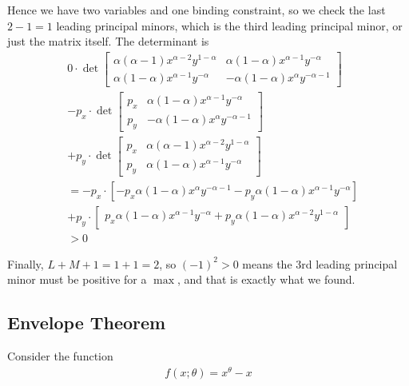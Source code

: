 \documentclass{article}
\begin{document}
Hence we have two variables and one binding constraint, so we check the last $2 - 1 = 1$ leading principal minors, which is the third leading principal minor, or just the matrix itself. The determinant is
\begin{align*}
  &
  0 \cdot \det
  \begin{bmatrix}
    \alpha (\alpha - 1) x^{\alpha - 2} y^{1 - \alpha} & \alpha (1 - \alpha) x^{\alpha - 1} y^{- \alpha} \\
    \alpha (1 - \alpha) x^{\alpha - 1} y^{- \alpha} & - \alpha (1 - \alpha) x^{\alpha} y^{-\alpha - 1}
  \end{bmatrix}
  \\
  &
  -
  p_x \cdot \det
  \begin{bmatrix}
    p_x  & \alpha (1 - \alpha) x^{\alpha - 1} y^{- \alpha} \\
    p_y  & - \alpha (1 - \alpha) x^{\alpha} y^{-\alpha - 1}
  \end{bmatrix}
  \\
  &
  +
  p_y \cdot \det
  \begin{bmatrix}
    p_x  & \alpha (\alpha - 1) x^{\alpha - 2} y^{1 - \alpha} \\
    p_y  & \alpha (1 - \alpha) x^{\alpha - 1} y^{- \alpha}
  \end{bmatrix}
  \\
  &
  =
  -
  p_x \cdot
  \left[
    - p_x \alpha (1 - \alpha) x^{\alpha} y^{-\alpha - 1}
    - p_y \alpha (1 - \alpha) x^{\alpha - 1} y^{- \alpha}
  \right]
  \\
  &
  +
  p_y \cdot
  \begin{bmatrix}
    p_x
    \alpha (1 - \alpha) x^{\alpha - 1} y^{- \alpha}
    +
    p_y
    \alpha (1 - \alpha) x^{\alpha - 2} y^{1 - \alpha}
  \end{bmatrix}
  \\
  &
  >
  0
\end{align*}

Finally, $L + M + 1 = 1 + 1 = 2$, so $(-1)^2 > 0$ means the 3rd leading principal minor must be positive for a $\max$, and that is exactly what we found.

\subsection{Envelope Theorem}
\label{sub:envelope_theorem}

Consider the function
\begin{align*}
  f(x; \theta) = x^\theta - x
\end{align*}
\end{document}
